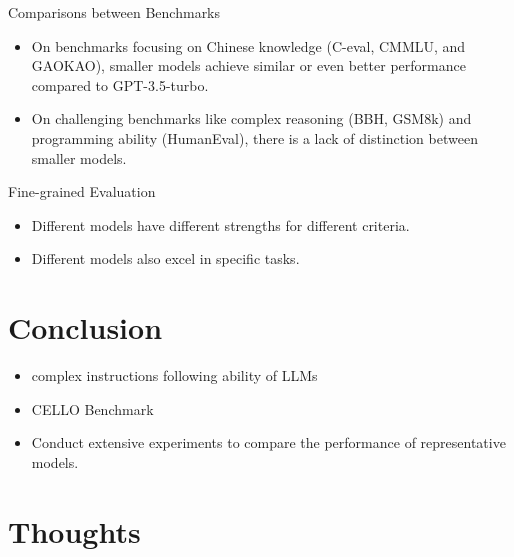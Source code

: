 \documentclass{beamer}
\begin{document}
\begin{frame}{Comparisons between Benchmarks}
    \begin{itemize}
        \item {On benchmarks focusing on Chinese knowledge (C-eval, CMMLU, and GAOKAO), smaller models achieve similar or even better performance compared to GPT-3.5-turbo.}
        \item {On challenging benchmarks like complex reasoning (BBH, GSM8k) and programming ability (HumanEval), there is a lack of distinction between smaller models.}
    \end{itemize}
\end{frame}

\begin{frame}{Fine-grained Evaluation}
    \begin{itemize}
        \item {Different models have different strengths for different criteria.}
        \item {Different models also excel in specific tasks.}
    \end{itemize}
\end{frame}

\section{Conclusion}

\begin{frame}
    \begin{itemize}
        \item {complex instructions following ability of LLMs}
        \item {CELLO Benchmark}
        \item {Conduct extensive experiments to compare the performance of representative models.}
    \end{itemize}
\end{frame}

\section{Thoughts}
\end{document}
